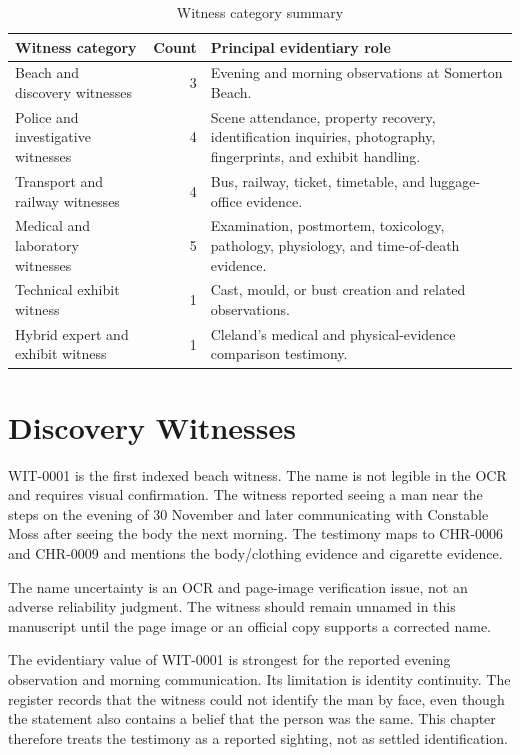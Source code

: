 \begin{table}[htbp]
\centering
\caption{Witness category summary}
\label{tab:witness-category-summary}
\begin{tabularx}{\textwidth}{>{\raggedright\arraybackslash}p{}r>{\raggedright\arraybackslash}X}
\toprule
Witness category & Count & Principal evidentiary role \\
\midrule
Beach and discovery witnesses & 3 & Evening and morning observations at Somerton Beach. \\
Police and investigative witnesses & 4 & Scene attendance, property recovery, identification inquiries, photography, fingerprints, and exhibit handling. \\
Transport and railway witnesses & 4 & Bus, railway, ticket, timetable, and luggage-office evidence. \\
Medical and laboratory witnesses & 5 & Examination, postmortem, toxicology, pathology, physiology, and time-of-death evidence. \\
Technical exhibit witness & 1 & Cast, mould, or bust creation and related observations. \\
Hybrid expert and exhibit witness & 1 & Cleland's medical and physical-evidence comparison testimony. \\
\bottomrule
\end{tabularx}
\end{table}

\section{Discovery Witnesses}

WIT-0001 is the first indexed beach witness. The name is not legible in the OCR and requires visual confirmation. The witness reported seeing a man near the steps on the evening of 30 November and later communicating with Constable Moss after seeing the body the next morning. The testimony maps to CHR-0006 and CHR-0009 and mentions the body/clothing evidence and cigarette evidence.

The name uncertainty is an OCR and page-image verification issue, not an adverse reliability judgment. The witness should remain unnamed in this manuscript until the page image or an official copy supports a corrected name.

The evidentiary value of WIT-0001 is strongest for the reported evening observation and morning communication. Its limitation is identity continuity. The register records that the witness could not identify the man by face, even though the statement also contains a belief that the person was the same. This chapter therefore treats the testimony as a reported sighting, not as settled identification.

